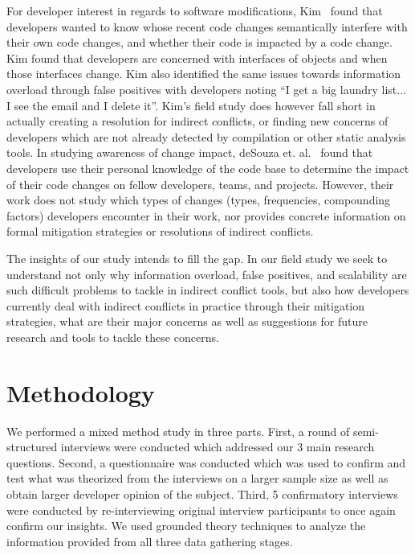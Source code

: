 \documentclass[conference]{IEEEtran}
\begin{document}
For developer interest in regards to software modifications, Kim~\cite{Kim:2011:ESA} found that developers wanted to know whose
recent code changes semantically interfere with their own code changes, and whether their code is impacted by a code change.
Kim found that developers are concerned with interfaces of objects and when those interfaces change. Kim also identified the same
issues towards information overload through false positives with developers noting ``I get a big laundry list... I see the email and I delete it''.
Kim's field study does however fall short in actually creating a resolution for indirect conflicts, or finding new concerns of
developers which are not already detected by compilation or other static analysis tools.
In studying awareness of change impact, deSouza et. al.~\cite{deSouza:2008:ESS} found that developers use their personal knowledge of the
code base to determine the impact of their code changes on fellow developers, teams, and projects. However, their work does not
study which types of changes (types, frequencies, compounding factors) developers encounter in their work, nor provides concrete information on formal mitigation strategies or resolutions of indirect conflicts.

The insights of our study intends to fill the gap. In our field study we seek to understand not only  why information overload, false positives, and scalability are such difficult problems to tackle
in indirect conflict tools, but also how developers currently deal with indirect conflicts in practice through
their mitigation strategies, what are their major concerns as well as suggestions for future research and tools to tackle these concerns.

\section{Methodology}
\label{sec:meth}

We performed a mixed method study in three parts. First, a round of semi-structured interviews were conducted which
addressed our 3 main research questions. Second, a questionnaire was conducted
which was used to confirm and test what was theorized from the interviews on a larger sample size as well as obtain
larger developer opinion of the subject. Third, 5 confirmatory interviews were conducted by re-interviewing original
interview participants to once again confirm our insights.
We used grounded theory techniques to analyze the information provided from all three data gathering stages.
\end{document}
